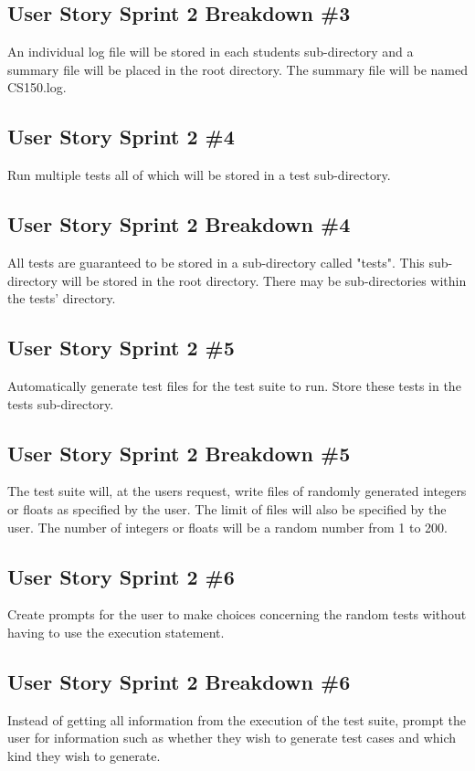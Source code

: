 \subsection{User Story Sprint 2 Breakdown \#3}
An individual log file will be stored in each students sub-directory and a summary file will be placed in the root directory. The summary file will be named CS150.log.

\subsection{User Story Sprint 2 \#4}
Run multiple tests all of which will be stored in a test sub-directory.

\subsection{User Story Sprint 2 Breakdown \#4}
All tests are guaranteed to be stored in a sub-directory called "tests".
This sub-directory will be stored in the root directory. There may be sub-directories within the tests' directory.

\subsection{User Story Sprint 2 \#5}
Automatically generate test files for the test suite to run. Store these tests in the tests sub-directory.

\subsection{User Story Sprint 2 Breakdown \#5}
The test suite will, at the users request, write files of randomly generated integers or floats as specified by the user. The limit of files will also be specified by the user. The number of integers or floats will be a random number from 1 to 200.

\subsection{User Story Sprint 2 \#6}
Create prompts for the user to make choices concerning the random tests without having to use the execution statement.

\subsection{User Story Sprint 2 Breakdown \#6}
Instead of getting all information from the execution of the test suite, prompt the user for information such as  whether they wish to generate test cases and which kind they wish to generate.

